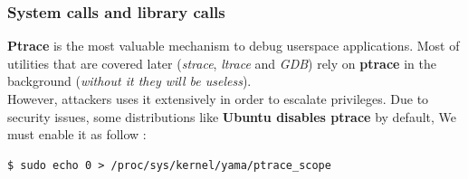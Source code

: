 \subsubsection{System calls and library calls}
\label{System calls and library calls}
\textbf{Ptrace} is the most valuable mechanism to debug userspace applications. Most of utilities that are covered later (\emph{strace}, \emph{ltrace} and \emph{GDB}) rely on \textbf{ptrace} in the background (\emph{without it they will be useless}).\\

However, attackers uses it extensively in order to escalate privileges.
Due to security issues, some distributions like \textbf{\color{red}Ubuntu disables ptrace} by default, We must enable it as follow :

\begin{lstlisting}[style=BashInputStyle]
$ sudo echo 0 > /proc/sys/kernel/yama/ptrace_scope
\end{lstlisting}
\vspace{5px}

